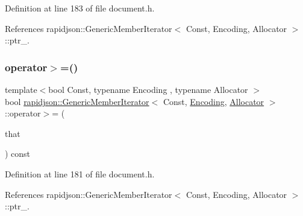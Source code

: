 Definition at line 183 of file document.\+h.


\begin{DoxyCode}{0}

\end{DoxyCode}


References rapidjson\+::\+Generic\+Member\+Iterator$<$ Const, Encoding, Allocator $>$\+::ptr\+\_\+.

\mbox{\label{classrapidjson_1_1_generic_member_iterator_a1cfebee3ec82a524dfe3788854eebb8c}} 
\subsubsection{\texorpdfstring{operator$>$=()}{operator>=()}}
{\footnotesize\ttfamily template$<$bool Const, typename Encoding , typename Allocator $>$ \\
bool \mbox{\hyperlink{classrapidjson_1_1_generic_member_iterator}{rapidjson\+::\+Generic\+Member\+Iterator}}$<$ Const, \mbox{\hyperlink{classrapidjson_1_1_encoding}{Encoding}}, \mbox{\hyperlink{classrapidjson_1_1_allocator}{Allocator}} $>$\+::operator$>$= (\begin{DoxyParamCaption}\item[{\mbox{\hyperlink{classrapidjson_1_1_generic_member_iterator_a61b9a9ba8a5917d90406532f104605cc}{Const\+Iterator}}}]{that }\end{DoxyParamCaption}) const}



Definition at line 181 of file document.\+h.


\begin{DoxyCode}{0}

\end{DoxyCode}


References rapidjson\+::\+Generic\+Member\+Iterator$<$ Const, Encoding, Allocator $>$\+::ptr\+\_\+.

